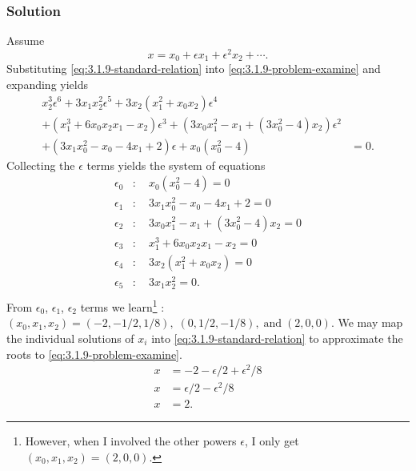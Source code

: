 \documentclass[12pt]{article}
\begin{document}
\subsubsection*{Solution}
Assume
\begin{equation}
  \label{eq:3.1.9-standard-relation}
  x=x_0+\epsilon x_1 + \epsilon^2x_2+\cdots.
\end{equation}
Substituting \cref{eq:3.1.9-standard-relation} into
\cref{eq:3.1.9-problem-examine} and expanding yields
\begin{equation}
  \label{eq:3.1.9-system}
  \begin{split}
    x_2^3 \epsilon ^6+3 x_1 x_2^2 \epsilon ^5
    +3 x_2 \left(x_1^2+x_0 x_2\right) \epsilon ^4 \\
    +\left(x_1^3+6 x_0 x_2 x_1-x_2\right) \epsilon ^3
    +\left(3 x_0 x_1^2-x_1+\left(3 x_0^2-4\right) x_2\right) \epsilon ^2 \\
    +\left(3 x_1 x_0^2-x_0-4 x_1+2\right) \epsilon
    +x_0 \left(x_0^2-4\right) &=0.
  \end{split}
\end{equation}
Collecting the $\epsilon$ terms yields the system of equations
\begin{equation}
  \label{eq:3.1.9-expansion}
  \begin{aligned}
    \epsilon_0 &:\quad x_0 \left(x_0^2-4\right)=0 \\
    \epsilon_1 &:\quad 3x_1 x_0^2-x_0-4 x_1+2=0 \\
    \epsilon_2 &:\quad 3x_0 x_1^2-x_1+\left(3 x_0^2-4\right) x_2=0 \\
    \epsilon_3 &:\quad x_1^3+6 x_0 x_2 x_1-x_2=0 \\
    \epsilon_4 &:\quad 3x_2 \left(x_1^2+x_0 x_2\right)=0 \\
    \epsilon_5 &:\quad 3x_1 x_2^2=0. \\
  \end{aligned}
\end{equation}
From $\epsilon_0$, $\epsilon_1$, $\epsilon_2$ terms we learn\footnote{However,
  when I involved the other powers $\epsilon$, I only get $(x_0,x_1,x_2)
  =(2,0,0).$} : $(x_0,x_1,x_2) =(-2, -1/2, 1/8),\; (0,1/2,-1/8), \;\text{and}\;
(2, 0, 0)$. We may map the individual solutions of $x_i$ into
\cref{eq:3.1.9-standard-relation} to approximate the roots to
\cref{eq:3.1.9-problem-examine}.
\begin{equation*}
  \begin{aligned}
    x &= -2 - \epsilon/2 + \epsilon^2/8 \\
    x &= \epsilon/2 - \epsilon^2/8 \\
    x &= 2.
  \end{aligned}
\end{equation*}
\end{document}
